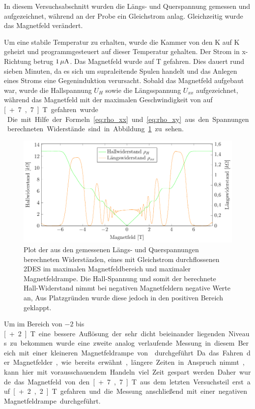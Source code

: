 
In diesem Versuchsabschnitt wurden die Längs- und Querspannung gemessen und aufgezeichnet, während an der Probe ein Gleichstrom anlag. Gleichzeitig wurde das Magnetfeld verändert.

Um eine stabile Temperatur zu erhalten, wurde die Kammer von den \unit[1,5]{K} auf \unit[2]{K} geheizt und programmgesteuert auf dieser Temperatur gehalten. Der Strom in x-Richtung betrug $\unit[1]{\mu A}$. Das Magnetfeld wurde auf \unit[-7,7]{T} gefahren. Dies dauert rund sieben Minuten, da es sich um supraleitende Spulen handelt und das Anlegen eines Stroms eine Gegeninduktion verursacht. Sobald das Magnetfeld aufgebaut war, wurde die Hallspannung $U_H$ sowie die Längsspannung $U_{xx}$ aufgezeichnet, während das Magnetfeld mit der maximalen Geschwindigkeit von  auf \unit[+7,7]{T} gefahren wurde.\\

Die mit Hilfe der Formeln~\eqref{eq:rho_xx} und \eqref{eq:rho_xy} aus den Spannungen berechneten Widerstände sind in Abbildung~\ref{fig:full_range_dc} zu sehen.

\begin{figure}[h]
	\centering
	\includegraphics[scale=1]{graphs/dc/full_range.pdf}
	\caption[Gleichstrommessung im maximalen Magnetfeldbereich]{
		Plot der aus den gemessenen Längs- und Querspannungen berechneten Widerständen, eines mit Gleichstrom durchflossenen 2DES im maximalen Magnetfeldbereich und maximaler Magnetfeldrampe. Die Hall-Spannung und somit der berechnete Hall-Widerstand nimmt bei negativen Magnetfeldern negative Werte an, Aus Platzgründen wurde diese jedoch in den positiven Bereich geklappt.
	}
	\label{fig:full_range_dc}
\end{figure}

Um im Bereich von $-2$ bis \unit[+2]{T} eine bessere Auflösung der sehr dicht beieinander liegenden Niveaus zu bekommen wurde eine zweite analog verlaufende Messung in diesem Bereich mit einer kleineren Magnetfeldrampe von  durchgeführt. Da das Fahren der Magnetfelder, wie bereits erwähnt, längere Zeiten in Anspruch nimmt, kann hier mit vorausschauendem Handeln viel Zeit gespart werden. Daher wurde das Magnetfeld von den \unit[+7,7]{T} aus dem letzten Versuchsteil erst auf \unit[+2,2]{T} gefahren und die Messung anschließend mit einer negativen Magnetfeldrampe durchgeführt.

